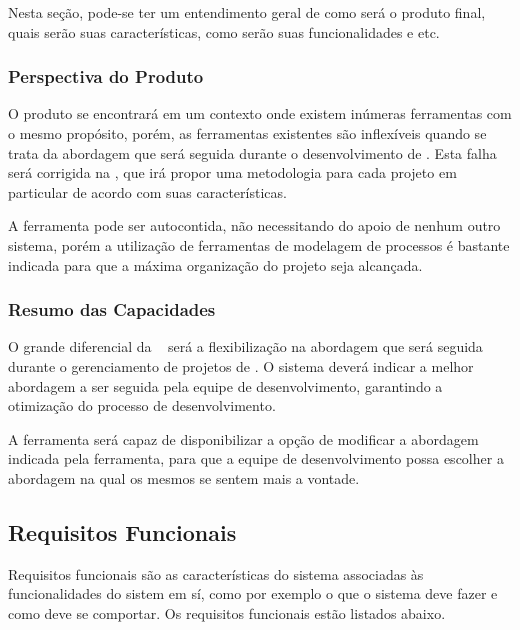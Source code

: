 Nesta seção, pode-se ter um entendimento geral de como será o produto final, quais serão suas características, como serão suas funcionalidades e etc.

\subsubsection{Perspectiva do Produto}
	
O produto se encontrará em um contexto onde existem inúmeras ferramentas com o mesmo propósito, porém, as ferramentas existentes são inflexíveis quando se trata da abordagem que será seguida durante o desenvolvimento de \sw. Esta falha será corrigida na \nomeferramenta, que irá propor uma metodologia para cada projeto em particular de acordo com suas características.

A ferramenta pode ser autocontida, não necessitando do apoio de nenhum outro sistema, porém a utilização de ferramentas de modelagem de processos é bastante indicada para que a máxima organização do projeto seja alcançada.

\subsubsection{Resumo das Capacidades}
	
O grande diferencial da \nomeferramenta~ será a flexibilização na abordagem que será seguida durante o gerenciamento de projetos de \sw. O sistema deverá indicar a melhor abordagem a ser seguida pela equipe de desenvolvimento, garantindo a otimização do processo de desenvolvimento.

A ferramenta será capaz de disponibilizar a opção de modificar a abordagem indicada pela ferramenta, para que a equipe de desenvolvimento possa escolher a abordagem na qual os mesmos se sentem mais a vontade.

\subsection{Requisitos Funcionais}
	Requisitos funcionais são as características do sistema associadas às funcionalidades do sistem em sí, como por exemplo o que o sistema deve fazer e como deve se comportar. Os requisitos funcionais estão listados abaixo.

